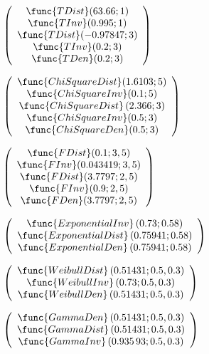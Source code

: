 \documentclass{article}
\begin{document}
$\left( 
\begin{array}{c}
\func{TDist}(63.66;1) \\ 
\func{TInv}(0.995;1) \\ 
\func{TDist}(-0.97847;3) \\ 
\func{TInv}(0.2;3) \\ 
\func{TDen}(0.2;3)%
\end{array}%
\right) $

$\left( 
\begin{array}{c}
\func{ChiSquareDist}(1.6103;5) \\ 
\func{ChiSquareInv}(0.1;5) \\ 
\func{ChiSquareDist}\left( 2.366;3\right)  \\ 
\func{ChiSquareInv}(0.5;3) \\ 
\func{ChiSquareDen}(0.5;3)%
\end{array}%
\right) $

$\left( 
\begin{array}{c}
\func{FDist}(0.1;3,5) \\ 
\func{FInv}(0.043419;3,5) \\ 
\func{FDist}(3.7797;2,5) \\ 
\func{FInv}(0.9;2,5) \\ 
\func{FDen}(3.7797;2,5)%
\end{array}%
\right) $

$\left( 
\begin{array}{c}
\func{ExponentialInv}\left( 0.73;0.58\right)  \\ 
\func{ExponentialDist}\left( 0.75941;0.58\right)  \\ 
\func{ExponentialDen}\left( 0.75941;0.58\right) 
\end{array}%
\right) $

$\left( 
\begin{array}{c}
\func{WeibullDist}\left( 0.51431;0.5,0.3\right)  \\ 
\func{WeibullInv}\left( 0.73;0.5,0.3\right)  \\ 
\func{WeibullDen}\left( 0.51431;0.5,0.3\right) 
\end{array}%
\right) $

$\left( 
\begin{array}{c}
\func{GammaDen}\left( 0.51431;0.5,0.3\right)  \\ 
\func{GammaDist}\left( 0.51431;0.5,0.3\right)  \\ 
\func{GammaInv}\left( 0.935\,93;0.5,0.3\right) 
\end{array}%
\right) $
\end{document}
